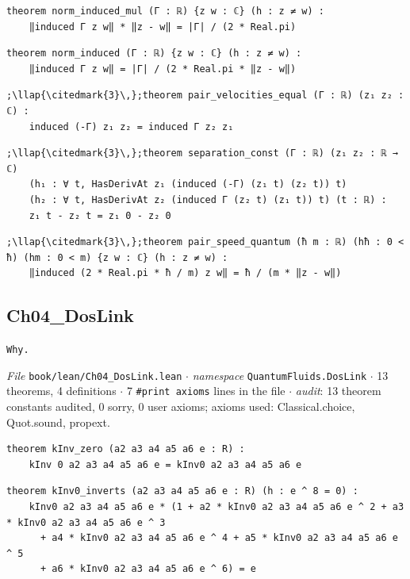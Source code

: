\begin{lstlisting}[style=leancat]
theorem norm_induced_mul (Γ : ℝ) {z w : ℂ} (h : z ≠ w) :
    ‖induced Γ z w‖ * ‖z - w‖ = |Γ| / (2 * Real.pi)
\end{lstlisting}

\begin{lstlisting}[style=leancat]
theorem norm_induced (Γ : ℝ) {z w : ℂ} (h : z ≠ w) :
    ‖induced Γ z w‖ = |Γ| / (2 * Real.pi * ‖z - w‖)
\end{lstlisting}

\begin{lstlisting}[style=leancat]
;\llap{\citedmark{3}\,};theorem pair_velocities_equal (Γ : ℝ) (z₁ z₂ : ℂ) :
    induced (-Γ) z₁ z₂ = induced Γ z₂ z₁
\end{lstlisting}

\begin{lstlisting}[style=leancat]
;\llap{\citedmark{3}\,};theorem separation_const (Γ : ℝ) (z₁ z₂ : ℝ → ℂ)
    (h₁ : ∀ t, HasDerivAt z₁ (induced (-Γ) (z₁ t) (z₂ t)) t)
    (h₂ : ∀ t, HasDerivAt z₂ (induced Γ (z₂ t) (z₁ t)) t) (t : ℝ) :
    z₁ t - z₂ t = z₁ 0 - z₂ 0
\end{lstlisting}

\begin{lstlisting}[style=leancat]
;\llap{\citedmark{3}\,};theorem pair_speed_quantum (ħ m : ℝ) (hħ : 0 < ħ) (hm : 0 < m) {z w : ℂ} (h : z ≠ w) :
    ‖induced (2 * Real.pi * ħ / m) z w‖ = ħ / (m * ‖z - w‖)
\end{lstlisting}

\subsection{Ch04\_\allowbreak{}DosLink}
{\footnotesize\raggedright\texttt{Why.\allowbreak{}}\par}
{\footnotesize\raggedright\emph{File} \texttt{book/lean/Ch04\_\allowbreak{}DosLink.\allowbreak{}lean} $\cdot$ \emph{namespace} \texttt{QuantumFluids.\allowbreak{}DosLink} $\cdot$ 13 theorems, 4 definitions $\cdot$ 7 \texttt{\#print axioms} lines in the file $\cdot$ \emph{audit}: 13 theorem constants audited, 0 sorry, 0 user axioms; axioms used: Classical.choice, Quot.sound, propext.\par}
\begin{lstlisting}[style=leancat]
theorem kInv_zero (a2 a3 a4 a5 a6 e : R) :
    kInv 0 a2 a3 a4 a5 a6 e = kInv0 a2 a3 a4 a5 a6 e
\end{lstlisting}

\begin{lstlisting}[style=leancat]
theorem kInv0_inverts (a2 a3 a4 a5 a6 e : R) (h : e ^ 8 = 0) :
    kInv0 a2 a3 a4 a5 a6 e * (1 + a2 * kInv0 a2 a3 a4 a5 a6 e ^ 2 + a3 * kInv0 a2 a3 a4 a5 a6 e ^ 3
      + a4 * kInv0 a2 a3 a4 a5 a6 e ^ 4 + a5 * kInv0 a2 a3 a4 a5 a6 e ^ 5
      + a6 * kInv0 a2 a3 a4 a5 a6 e ^ 6) = e
\end{lstlisting}

